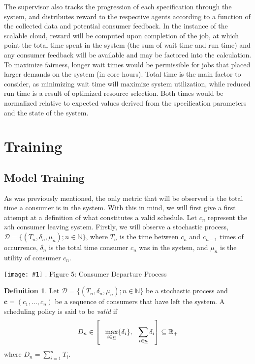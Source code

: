 \documentclass{article}
\theoremstyle{definition}
\newtheorem{definition}{Definition}[section]
\theoremstyle{remark}
\newcommand{\addpic}[1]{\texttt{[image: \#1]}}
\begin{document}
		The supervisor also tracks the progression of each specification through the system, and distributes reward to the respective agents according to a function of the collected data and potential consumer feedback. In the instance of the scalable cloud, reward will be computed upon completion of the job, at which point the total time spent in the system (the sum of wait time and run time) and any consumer feedback will be available and may be factored into the calculation. To maximize fairness, longer wait times would be permissible for jobs that placed larger demands on the system (in core hours). Total time is the main factor to consider, as minimizing wait time will maximize system utilization, while  reduced run time is a result of optimized resource selection. Both times would be normalized relative to expected values derived from the specification parameters and the state of the system.

	\section{Training}

		\subsection{Model Training}
		
		As was previously mentioned, the only metric that will be observed is the total time a consumer is in the system. With this in mind, we will first give a first attempt at a definition of what constitutes a valid schedule. Let $c_{n}$ represent the $n$th consumer leaving system. Firstly, we will observe a stochastic process, $\mathcal{D} = \{(T_{n}, \delta_{n}, \mu_{n}); n \in \mathbb{N}\}$, where $T_{n}$ is the time between $c_{n}$ and $c_{n-1}$ times of occurrence, $\delta_{n}$ is the total time consumer $c_{n}$ was in the system, and $\mu_{n}$ is the utility of consumer $c_{n}$.
		
		\addpic{figures/consumer-departure-process.png}
		.\hspace{3.5 cm}  Figure 5:  Consumer Departure Process	
	
		\begin{definition}
			Let $\mathcal{D} = \{(T_{n}, \delta_{n}, \mu_{n}); n \in \mathbb{N}\}$ be a stochastic process and $\mathbf{c} = (c_{1}, \ldots ,c_{n})$ be a sequence of consumers that have left the system. A scheduling policy is said to be \emph{valid} if
			\[
			D_{n} \in \left[\hspace{0.1in}\max_{i \in \underline{n}}\{\delta_{i}\}, \hspace{0.1in} \sum_{i \in \underline{n}}{\delta_{i}}\right] \subseteq \mathbb{R}_{+}
			\] 
			where $D_{n} = \sum_{i=1}^{n}{T_{i}}$.
		\end{definition}
		
\end{document}
